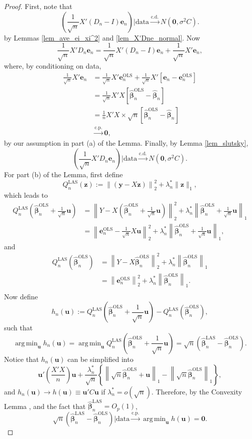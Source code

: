 \documentclass[12pt]{article}
\DeclareMathOperator*{\argmin}{arg\,min} %
\newcommand{\bhat}{\widehat{\bm{\beta}}_n} %
\newcommand{\bLAS}{\widehat{\bm{\beta}}_n^{\text{LAS}}} %
\newcommand{\bLS}{\widehat{\bm{\beta}}_n^{\text{OLS}}} %
\newcommand{\eLS}{\bm{e}_n^{\text{OLS}}} %
\newcommand{\dn}{\frac{1}{n}} %
\newcommand{\dqn}{\frac{1}{\sqrt{n}}} %
\newcommand{\CONV}[1]{\stackrel{\text{#1}}{\longrightarrow}} %
\newcommand{\bu}{\bm{u}} %
\begin{document}
\begin{proof}
	First, note that
		$$
		\left( 
			\dqn X' (D_n - I) \bm{e}_n 
		\right) \bigg| \text{data}
		\CONV{c.d.} 
		N \left( \bm{0}, \sigma^2 C \right).
		$$
	by Lemmas \ref{lem_ave_ei_xi^2} and \ref{lem_X'Dne_normal}. Now
		$$
		\dqn X' D_n \bm{e}_n = \dqn X' (D_n - I) \bm{e}_n + \dqn X' \bm{e}_n,
		$$
	where, by conditioning on data,
	\begin{align*}
		\dqn X' \bm{e}_n
		&= \dqn X' \eLS   
			+ \dqn X' 
			\left[
				\bm{e}_n - \eLS 		
			\right] \\
		&= \dqn X'X
			\left[
				\bLS - \bhat
			\right] \\
		&= \dn X'X
			\times
			\sqrt{n}
			\left[
				\bLS - \bhat
			\right] \\
		&\CONV{c.p.} \bm{0}, 
	\end{align*}
	by our assumption in part (a) of the Lemma. Finally, by Lemma \ref{lem_slutsky},
		$$
		\left( 
			\dqn X' D_n \bm{e}_n 
		\right) \bigg| \text{data}
		\CONV{c.d.} 
		N \left( \bm{0}, \sigma^2 C \right).
		$$
	For part (b) of the Lemma, first define
		$$
		Q_n^{\text{LAS}} (\bm{z}) 
		:= \left\| 
				(\bm{y} - X \bm{z})
			\right\|_2^2 
			+ \lambda_n^* \| \bm{z} \|_1,
		$$
	which leads to 
	\begin{align*}
	Q_n^{\text{LAS}} \left( \bLS + \dqn \bu \right)
	&= \left\| 
			Y - X \left( \bLS + \dqn \bu \right)				
		\right\|_2^2
		+ \lambda_n^* 
			\left\|
				\bLS + \dqn \bu
			\right\|_1 \\
	&= \left\| 
			\eLS - \dqn X \bu 
		\right\|_2^2
		+ \lambda_n^* 
			\left\|
					\bLS + \dqn \bu
			\right\|_1, 
	\end{align*}
	and 
	\begin{align*}
	Q_n^{\text{LAS}} \left( \bLS  \right)
	&= \left\| 
			Y - X \bLS 
		\right\|_2^2
		+ \lambda_n^* \left\| \bLS \right\|_1 \\
	&= \left\| \eLS	\right\|_2^2
		+ \lambda_n^* \left\| \bLS \right\|_1 .\\
	\end{align*}
	Now define
	$$
	h_n(\bu) := Q_n^{\text{LAS}} \left( \bLS  + \dqn \bu \right) 
				- Q_n^{\text{LAS}} \left( \bLS  \right), 
	$$
	such that 
	$$
	\argmin_{\bu} h_n(\bu)
	= \argmin_{\bu}  Q_n^{\text{LAS}} 
					\left( \bLS  + \dqn \bu \right)
	= \sqrt{n} \left( \bLAS - \bLS \right).
	$$
	Notice that $h_n(\bu)$ can be simplified into 
	$$
	\bu' \left( \dfrac{X' X}{n} \right) \bu
	+ \dfrac{\lambda_n^*}{\sqrt{n}} 
		\left\{
			\left\| \sqrt{n} \bLS + \bu \right\|_1
			- \left\| \sqrt{n} \bLS \right\|_1 
		\right\},
	$$ 
	and $h_n(\bu) \to h(\bu) \equiv \bu' C \bu$ if $\lambda_n^* = o(\sqrt{n})$. Therefore, by the Convexity Lemma \citep{Pollard1991}, and the fact that $\bLAS = O_p(1)$,
	$$
	\sqrt{n} \left( \bLAS - \bLS \right)
	\big| \text{data}
	\CONV{c.p.} \argmin_{\bu} h(\bu) = \bm{0}.
	$$ 
\end{proof}
\end{document}
